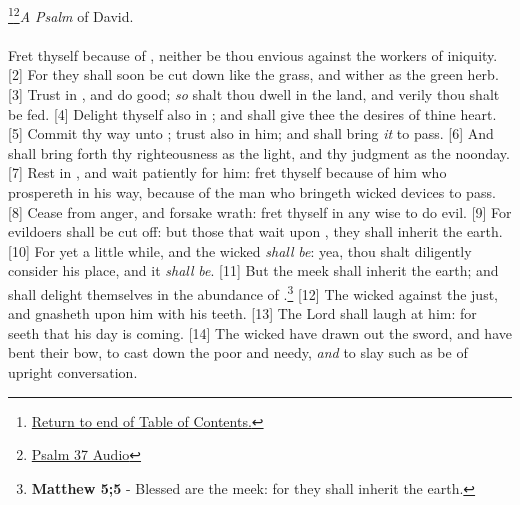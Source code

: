 \footnote{\textcolor[cmyk]{0.99998,1,0,0}{\hyperlink{TOC}{Return to end of Table of Contents.}}}\footnote{\href{https://audiobible.com/bible}{\textcolor[cmyk]{0.99998,1,0,0}{Psalm 37 Audio}}}\textcolor[cmyk]{0.99998,1,0,0}{\emph{A Psalm} of David.}\\
\\
\textcolor[cmyk]{0.99998,1,0,0}{Fret  thyself because of , neither be thou envious against the workers of iniquity.}
[2] \textcolor[cmyk]{0.99998,1,0,0}{For they shall soon be cut down like the grass, and wither as the green herb.}
[3] \textcolor[cmyk]{0.99998,1,0,0}{Trust in , and do good; \emph{so} shalt thou dwell in the land, and verily thou shalt be fed.}
[4] \textcolor[cmyk]{0.99998,1,0,0}{Delight thyself also in ; and  shall give thee the desires of thine heart.}
[5] \textcolor[cmyk]{0.99998,1,0,0}{Commit thy way unto ; trust also in him; and  shall bring \emph{it} to pass.}
[6] \textcolor[cmyk]{0.99998,1,0,0}{And  shall bring forth thy righteousness as the light, and thy judgment as the noonday.}
[7] \textcolor[cmyk]{0.99998,1,0,0}{Rest in , and wait patiently for him: fret  thyself because of him who prospereth in his way, because of the man who bringeth wicked devices to pass.}
[8] \textcolor[cmyk]{0.99998,1,0,0}{Cease from anger, and forsake wrath: fret  thyself in any wise to do evil.}
[9] \textcolor[cmyk]{0.99998,1,0,0}{For evildoers shall be cut off: but those that wait upon , they shall inherit the earth.}
[10] \textcolor[cmyk]{0.99998,1,0,0}{For yet a little while, and the wicked \emph{shall}  \emph{be}: yea, thou shalt diligently consider his place, and it \emph{shall}  \emph{be}.}
[11] \textcolor[cmyk]{0.99998,1,0,0}{But the meek shall inherit the earth; and shall delight themselves in the abundance of .}\footnote{\textbf{Matthew 5;5} - Blessed are the meek: for they shall inherit the earth.}
[12] \textcolor[cmyk]{0.99998,1,0,0}{The wicked  against the just, and gnasheth upon him with his teeth.}
[13] \textcolor[cmyk]{0.99998,1,0,0}{The Lord shall laugh at him: for  seeth that his day is coming.}
[14] \textcolor[cmyk]{0.99998,1,0,0}{The wicked have drawn out the sword, and have bent their bow, to cast down the poor and needy, \emph{and} to slay such as be of upright conversation.}
